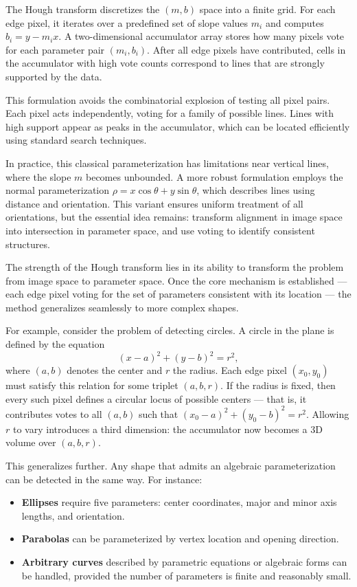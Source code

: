 The Hough transform discretizes the $(m, b)$ space into a finite grid. For each edge pixel, it iterates over a predefined set of slope values $m_i$ and computes $b_i = y - m_i x$. A two-dimensional accumulator array stores how many pixels vote for each parameter pair $(m_i, b_i)$. After all edge pixels have contributed, cells in the accumulator with high vote counts correspond to lines that are strongly supported by the data.

This formulation avoids the combinatorial explosion of testing all pixel pairs. Each pixel acts independently, voting for a family of possible lines. Lines with high support appear as peaks in the accumulator, which can be located efficiently using standard search techniques.

In practice, this classical parameterization has limitations near vertical lines, where the slope $m$ becomes unbounded. A more robust formulation employs the normal parameterization $\rho = x\cos\theta + y\sin\theta$, which describes lines using distance and orientation. This variant ensures uniform treatment of all orientations, but the essential idea remains: transform alignment in image space into intersection in parameter space, and use voting to identify consistent structures.

The strength of the Hough transform lies in its ability to transform the problem from image space to parameter space. Once the core mechanism is established — each edge pixel voting for the set of parameters consistent with its location — the method generalizes seamlessly to more complex shapes.

For example, consider the problem of detecting circles. A circle in the plane is defined by the equation
\[
(x - a)^2 + (y - b)^2 = r^2,
\]
where $(a, b)$ denotes the center and $r$ the radius. Each edge pixel $(x_0, y_0)$ must satisfy this relation for some triplet $(a, b, r)$. If the radius is fixed, then every such pixel defines a circular locus of possible centers — that is, it contributes votes to all $(a, b)$ such that $(x_0 - a)^2 + (y_0 - b)^2 = r^2$. Allowing $r$ to vary introduces a third dimension: the accumulator now becomes a 3D volume over $(a, b, r)$.

This generalizes further. Any shape that admits an algebraic parameterization can be detected in the same way. For instance:

\begin{itemize}
  \item \textbf{Ellipses} require five parameters: center coordinates, major and minor axis lengths, and orientation.
  \item \textbf{Parabolas} can be parameterized by vertex location and opening direction.
  \item \textbf{Arbitrary curves} described by parametric equations or algebraic forms can be handled, provided the number of parameters is finite and reasonably small.
\end{itemize}

